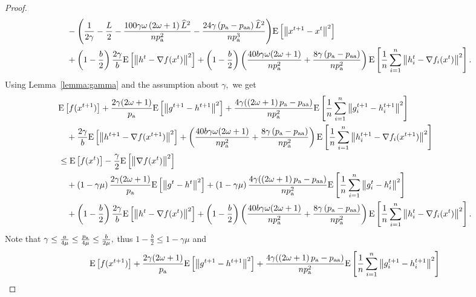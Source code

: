 \documentclass{article}
\newcommand*{\probavailable}{\ensuremath{p_{\textnormal{a}}}}
\newcommand*{\probpairaa}{\ensuremath{p_{\textnormal{aa}}}}
\begin{document}
\begin{proof}
\begin{align*}
      &\quad - \Bigg(\frac{1}{2\gamma} - \frac{L}{2} - \frac{100 \gamma \omega \left(2 \omega + 1\right) \widehat{L}^2}{n \probavailable^2} - \frac{24\gamma \left(\probavailable - \probpairaa\right)\widehat{L}^2}{n \probavailable^3}\Bigg) \Exp{\norm{x^{t+1} - x^t}^2} \\
      &\quad + \left(1 - \frac{b}{2}\right)\frac{2\gamma}{b} \Exp{\norm{h^{t} - \nabla f(x^{t})}^2} + \left(1 - \frac{b}{2}\right)\left(\frac{40 b \gamma \omega (2 \omega + 1)}{n \probavailable^2} + \frac{8 \gamma \left(\probavailable - \probpairaa\right)}{n \probavailable^2}\right)\Exp{\frac{1}{n}\sum_{i=1}^n\norm{h^{t}_i - \nabla f_i(x^{t})}^2}.
    \end{align*}
    Using Lemma~\ref{lemma:gamma} and the assumption about $\gamma,$ we get
    \begin{align*}
      &\Exp{f(x^{t + 1})} + \frac{2\gamma (2 \omega + 1)}{\probavailable} \Exp{\norm{g^{t+1} - h^{t+1}}^2} + \frac{4\gamma (\left(2 \omega + 1\right)\probavailable - \probpairaa)}{n \probavailable^2} \Exp{\frac{1}{n}\sum_{i=1}^n\norm{g^{t+1}_i - h^{t+1}_i}^2}\\
      &\quad  + \frac{2\gamma}{b} \Exp{\norm{h^{t+1} - \nabla f(x^{t+1})}^2} + \left(\frac{40 b \gamma \omega (2 \omega + 1)}{n \probavailable^2} + \frac{8 \gamma \left(\probavailable - \probpairaa\right)}{n \probavailable^2}\right) \Exp{\frac{1}{n}\sum_{i=1}^n\norm{h^{t+1}_i - \nabla f_i(x^{t+1})}^2}\\
      &\leq \Exp{f(x^t)} - \frac{\gamma}{2}\Exp{\norm{\nabla f(x^t)}^2} \\
      &\quad + \left(1 - \gamma \mu\right)\frac{2\gamma (2 \omega + 1)}{\probavailable} \Exp{\norm{g^{t} - h^{t}}^2} + \left(1 - \gamma \mu\right)\frac{4\gamma (\left(2 \omega + 1\right)\probavailable - \probpairaa)}{n \probavailable^2} \Exp{\frac{1}{n}\sum_{i=1}^n\norm{g^{t}_i - h^{t}_i}^2} \\
      &\quad + \left(1 - \frac{b}{2}\right)\frac{2\gamma}{b} \Exp{\norm{h^{t} - \nabla f(x^{t})}^2} + \left(1 - \frac{b}{2}\right)\left(\frac{40 b \gamma \omega (2 \omega + 1)}{n \probavailable^2} + \frac{8 \gamma \left(\probavailable - \probpairaa\right)}{n \probavailable^2}\right)\Exp{\frac{1}{n}\sum_{i=1}^n\norm{h^{t}_i - \nabla f_i(x^{t})}^2}.
    \end{align*}
    Note that $\gamma \leq \frac{a}{4\mu} \leq \frac{\probavailable}{4\mu} \leq \frac{b}{2\mu},$ thus $1 - \frac{b}{2} \leq 1 - \gamma \mu$ and 
    \begin{align*}
      &\Exp{f(x^{t + 1})} + \frac{2\gamma (2 \omega + 1)}{\probavailable} \Exp{\norm{g^{t+1} - h^{t+1}}^2} + \frac{4\gamma (\left(2 \omega + 1\right)\probavailable - \probpairaa)}{n \probavailable^2} \Exp{\frac{1}{n}\sum_{i=1}^n\norm{g^{t+1}_i - h^{t+1}_i}^2}\\

\end{align*}
\end{proof}
\end{document}
